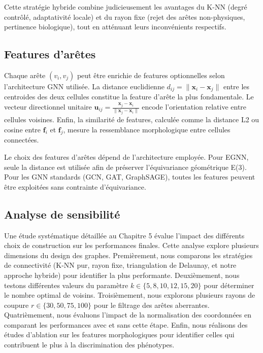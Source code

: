 Cette stratégie hybride combine judicieusement les avantages du K-NN (degré contrôlé, adaptativité locale) et du rayon fixe (rejet des arêtes non-physiques, pertinence biologique), tout en atténuant leurs inconvénients respectifs.

\subsection{Features d'arêtes}

Chaque arête $(v_i, v_j)$ peut être enrichie de features optionnelles selon l'architecture GNN utilisée. La distance euclidienne $d_{ij} = \|\mathbf{x}_i - \mathbf{x}_j\|$ entre les centroides des deux cellules constitue la feature d'arête la plus fondamentale. Le vecteur directionnel unitaire $\mathbf{u}_{ij} = \frac{\mathbf{x}_j - \mathbf{x}_i}{\|\mathbf{x}_j - \mathbf{x}_i\|}$ encode l'orientation relative entre cellules voisines. Enfin, la similarité de features, calculée comme la distance L2 ou cosine entre $\mathbf{f}_i$ et $\mathbf{f}_j$, mesure la ressemblance morphologique entre cellules connectées.

Le choix des features d'arêtes dépend de l'architecture employée. Pour EGNN, seule la distance est utilisée afin de préserver l'équivariance géométrique E(3). Pour les GNN standards (GCN, GAT, GraphSAGE), toutes les features peuvent être exploitées sans contrainte d'équivariance.

\subsection{Analyse de sensibilité}

Une étude systématique détaillée au Chapitre 5 évalue l'impact des différents choix de construction sur les performances finales. Cette analyse explore plusieurs dimensions du design des graphes. Premièrement, nous comparons les stratégies de connectivité (K-NN pur, rayon fixe, triangulation de Delaunay, et notre approche hybride) pour identifier la plus performante. Deuxièmement, nous testons différentes valeurs du paramètre $k \in \{5, 8, 10, 12, 15, 20\}$ pour déterminer le nombre optimal de voisins. Troisièmement, nous explorons plusieurs rayons de coupure $r \in \{30, 50, 75, 100\}$ pour le filtrage des arêtes aberrantes. Quatrièmement, nous évaluons l'impact de la normalisation des coordonnées en comparant les performances avec et sans cette étape. Enfin, nous réalisons des études d'ablation sur les features morphologiques pour identifier celles qui contribuent le plus à la discrimination des phénotypes.

